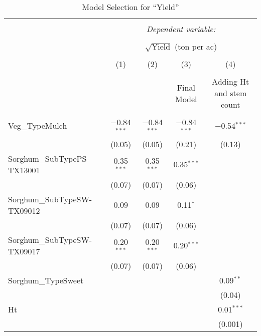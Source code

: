 \begin{table}[H] \centering 
\footnotesize
  \caption{Model Selection for ``Yield''} 
  \label{Tab:Tab3} 
\begin{tabular}{@{\extracolsep{5pt}}lccc|c} 
\\[-1.8ex]\hline 
\hline \\[-1.8ex] 
 & \multicolumn{4}{c}{\textit{Dependent variable:}} \\ 
\cline{2-5} 
\\[-1.8ex] & \multicolumn{4}{c}{$\sqrt{\text{Yield}}$ (ton per ac)} \\ 
\\[-1.8ex] & (1) & (2) & (3) & (4)\\ 
\\[-1.8ex] &  &  & Final Model & Adding Ht and stem count\\ 
\hline \\[-1.8ex] 
 Veg\_TypeMulch & $-$0.84$^{***}$ & $-$0.84$^{***}$ & $-$0.84$^{***}$ & $-$0.54$^{***}$ \\ 
  & (0.05) & (0.05) & (0.21) & (0.13) \\ 
 Sorghum\_SubTypePS-TX13001 & 0.35$^{***}$ & 0.35$^{***}$ & 0.35$^{***}$ &  \\ 
  & (0.07) & (0.07) & (0.06) &  \\ 
 Sorghum\_SubTypeSW-TX09012 & 0.09 & 0.09 & 0.11$^{*}$ &  \\ 
  & (0.07) & (0.07) & (0.06) &  \\ 
 Sorghum\_SubTypeSW-TX09017 & 0.20$^{***}$ & 0.20$^{***}$ & 0.20$^{***}$ &  \\ 
  & (0.07) & (0.07) & (0.06) &  \\ 
 Sorghum\_TypeSweet &  &  &  & 0.09$^{**}$ \\ 
  &  &  &  & (0.04) \\ 
 Ht &  &  &  & 0.01$^{***}$ \\ 
  &  &  &  & (0.001) \\ 

\end{tabular}
\end{table}

